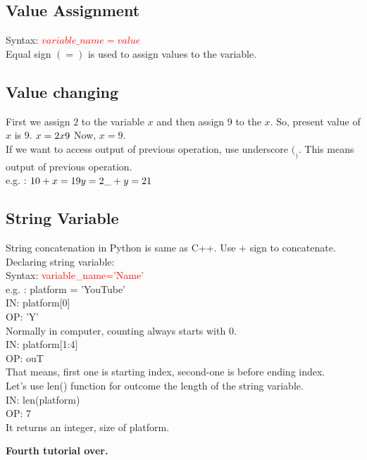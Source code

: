 \documentclass[11 pt, letterpaper]{report}
\begin{document}
\subsection{Value Assignment}
Syntax: \textcolor{red}{$variable\_name = value$} \\
Equal sign $( = )$ is used to assign values to the variable.
\subsection{Value changing}
First we assign $2$ to the variable $x$ and then assign $9$ to the $x$. So, present value of $x$ is $9$.
$
x = 2\\
x  9\\
$
Now, $x=9$.
\\
If we want to access output of previous operation, use underscore $( _ )$. This means output of previous operation.
\\e.g. : $10 + x\\
= 19\\
y = 2\\
\_+ y\\
= 21\\
$
\subsection{String Variable}
String concatenation in Python is same as C++. Use $+$ sign to concatenate.\\
Declaring string variable:\\
Syntax: \textcolor{red}{variable\_name='Name'}\\
e.g. : platform = 'YouTube'\\
IN: platform[0]\\
OP: 'Y'\\
Normally in computer, counting always starts with 0.\\
IN: platform[1:4]\\
OP: ouT\\
That means, first one is starting index, second-one is before ending index.\\
Let's use len() function for outcome the length of the string variable.\\
IN: len(platform)\\
OP: 7\\
It returns an integer, size of platform.\\
\begin{flushright}
\textbf{Fourth tutorial over.}
\end{flushright}
\end{document}
